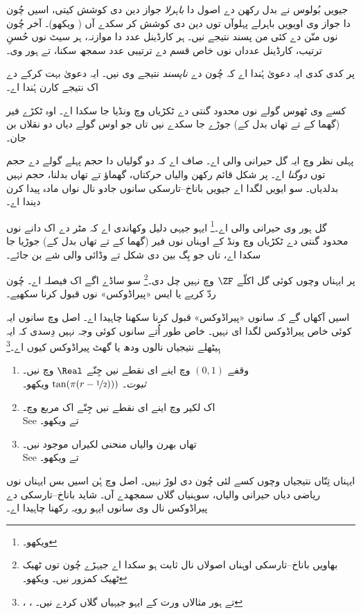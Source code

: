 \documentclass[../../../include/open-logic-section]{subfiles}
\begin{document}

جیویں بُولوس نے بدل رکھن دے اصول دا \emph{باہرلا} جواز دین دی کوشش کیتی، اسیں چُون دا جواز وی اویویں باہرلے پہلوآں توں دین دی کوشش کر سکدے آں ( ویکھو)۔ آخر چُون نوں منّن دے کئی من پسند نتیجے نیں۔ ہر کارڈینل عدد دا موازنہ، ہر سیٹ نوں حُسنِ ترتیب، کارڈینل عدداں نوں خاص قسم دے ترتیبی عدد سمجھ سکنا، تے ہور وی۔

پر کدی کدی ایہ دعویٰ ہُندا اے کہ چُون دے \emph{ناپسند} نتیجے وی نیں۔ ایہ دعویٰ بہت کرکے \cite{BanachTarski1924} دے اک نتیجے کارن ہُندا اے۔

\begin{thm}
کسے وی ٹھوس گولے نوں محدود گنتی دے ٹکڑیاں وچ ونڈیا جا سکدا اے۔ اوہ ٹکڑے فیر (گھما کے تے تھاں بدل کے) جوڑے جا سکدے نیں تاں جو اوس گولے دیاں دو نقلاں بن جان۔
\end{thm}
\noindent
پہلی نظر وچ ایہ گل حیرانی والی اے۔ صاف اے کہ دو گولیاں دا حجم پہلے گولے دے حجم توں \emph{دوگنا} اے۔ پر شکل قائم رکھن والیاں حرکتاں، گھماؤ تے تھاں بدلنا، حجم نہیں بدلدیاں۔ سو ایویں لگدا اے جیویں باناخ–تارسکی سانوں جادو نال نواں مادہ پیدا کرن دیندا اے۔

گل ہور وی حیرانی والی اے۔\footnote{\citet[Theorem 3.12]{Wagon2016} ویکھو۔} ایہو جیہی دلیل وکھاندی اے کہ مٹر دے اک دانے نوں محدود گنتی دے ٹکڑیاں وچ ونڈ کے اوہناں نوں فیر (گھما کے تے تھاں بدل کے) جوڑیا جا سکدا اے، تاں جو بِگ بین دی شکل تے وڈائی والی شے بن جائے۔

پر ایہناں وچوں کوئی گل اکلّے $\ZF$ وچ نہیں چل دی۔\footnote{بھاویں باناخ–تارسکی اوہناں اصولاں نال ثابت ہو سکدا اے جیہڑے چُون توں ٹھیک ٹھیک کمزور نیں۔ \citet[303]{Wagon2016} ویکھو۔} سو ساڈے اگے اک فیصلہ اے۔ چُون ردّ کریے یا ایس «پیراڈوکس» نوں قبول کرنا سکھیے۔

اسیں آکھاں گے کہ سانوں «پیراڈوکس» قبول کرنا سکھنا چاہیدا اے۔ اصل وچ سانوں ایہ کوئی خاص پیراڈوکس لگدا ای نہیں۔ خاص طور اُتے سانوں کوئی وجہ نہیں دِسدی کہ ایہ ہِیٹھلے نتیجیاں نالوں ودھ یا گھٹ پیراڈوکس کیوں اے۔\footnote{\citet[276--7]{Potter2004}، \citet[16]{Weston2003}، تے \citet[31, 308--9]{Wagon2016} ہور مثالاں ورت کے ایہو جیہیاں گلاں کردے نیں۔}
\begin{enumerate}
	\item وقفے $(0,1)$ وچ اینے ای نقطے نیں جِنّے $\Real$ وچ نیں۔
	\\\emph{ثبوت}۔ $\tan(\pi(r-\nicefrac{1}{2})))$ ویکھو۔
	\item اک لکیر وچ اینے ای نقطے نیں جِنّے اک مربع وچ۔
	\\See {} تے  ویکھو۔
	\item تھاں بھرن والیاں منحنی لکیراں موجود نیں۔
	\\See {} تے  ویکھو۔
\end{enumerate}
ایہناں تِنّاں نتیجیاں وچوں کسے لئی چُون دی لوڑ نہیں۔ اصل وچ ہُن اسیں بس ایہناں نوں ریاضی دیاں حیرانی والیاں، سوہنیاں گلاں سمجھدے آں۔ شاید باناخ–تارسکی دے پیراڈوکس نال وی سانوں ایہو رویہ رکھنا چاہیدا اے۔
\end{document}
